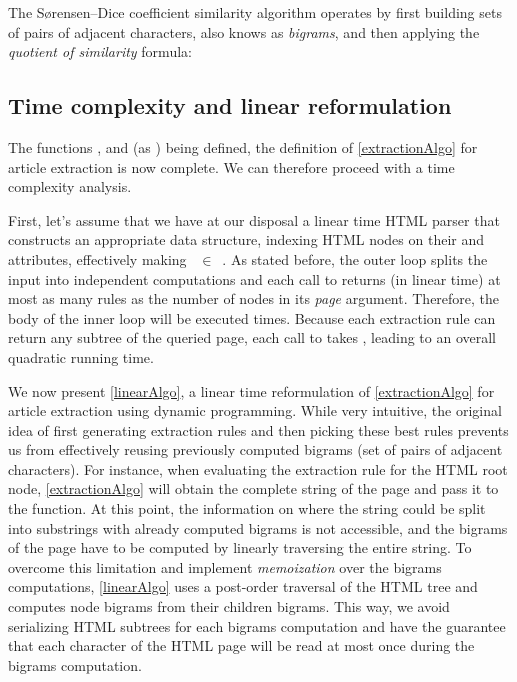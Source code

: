 \similarityTable

The Sørensen–Dice coefficient similarity algorithm operates by first building sets of pairs of adjacent characters, also knows as \emph{bigrams}, and then applying the \emph{quotient of similarity} formula:

\similarityAlgo


\subsection{Time complexity and linear reformulation}
\label{timecomplexityandlinearreformulation}

The functions ,  and  (as ) being defined, the definition of \autoref{extractionAlgo} for article extraction is now complete. We can therefore proceed with a time complexity analysis.

First, let's assume that we have at our disposal a linear time HTML parser that constructs an appropriate data structure, indexing HTML nodes on their  and  attributes, effectively making ~$\in$~. As stated before, the outer loop splits the input into independent computations and each call to  returns (in linear time) at most as many rules as the number of nodes in its \emph{page} argument. Therefore, the body of the inner loop will be executed  times. Because each extraction rule can return any subtree of the queried page, each call to  takes , leading to an overall quadratic running time.

We now present \autoref{linearAlgo}, a linear time reformulation of \autoref{extractionAlgo} for article extraction using dynamic programming. While very intuitive, the original idea of first generating extraction rules and then picking these best rules prevents us from effectively reusing previously computed bigrams (set of pairs of adjacent characters). For instance, when evaluating the extraction rule for the HTML root node, \autoref{extractionAlgo} will obtain the complete string of the page and pass it to the  function. At this point, the information on where the string could be split into substrings with already computed bigrams is not accessible, and the bigrams of the page have to be computed by linearly traversing the entire string. To overcome this limitation and implement \emph{memoization} over the bigrams computations, \autoref{linearAlgo} uses a post-order traversal of the HTML tree and computes node bigrams from their children bigrams. This way, we avoid serializing HTML subtrees for each bigrams computation and have the guarantee that each character of the HTML page will be read at most once during the bigrams computation.

